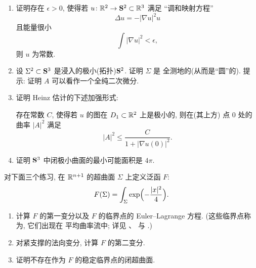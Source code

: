\begin{enumerate}[label=\textbf{Ex \arabic*.},leftmargin=3.7em,
  labelsep=0.5em,itemsep=0.85em,topsep=0.5em,parsep=0.35em]
\item 证明存在 $\epsilon>0$, 使得若 $u\colon\mathbb{R}^2\to\mathbf{S}^2\subset\mathbb{R}^3$ 满足
``调和映射方程''
\[
\Delta u=-|\nabla u|^2u
\]
且能量很小
\[
\int|\nabla u|^2<\epsilon,
\]
则 $u$ 为常数.

\item 设 $\Sigma^2\subset\mathbf{S}^3$ 是浸入的极小(拓扑)$\mathbf{S}^2$. 证明 $\Sigma$ 是
全测地的(从而是``圆''的). 提示: 证明 $A$ 可以看作一个全纯二次微分.

\item 证明 Heinz 估计的下述加强形式:

存在常数 $C$, 使得若 $u$ 的图在 $D_1\subset\mathbb{R}^2$ 上是极小的, 则在(其上方)
点 $0$ 处的曲率 $|A|^2$ 满足
\[
|A|^2\leq \frac{C}{1+|\nabla u(0)|^2}.
\]

\item 证明 $\mathbf{S}^3$ 中闭极小曲面的最小可能面积是 $4\pi$.

\end{enumerate}

{\setlength{\emergencystretch}{2em}%
对下面三个练习, 在 $\mathbb{R}^{n+1}$ 的超曲面 $\Sigma$ 上定义泛函 $F$:
\begin{equation}
F(\Sigma)=\int_\Sigma \exp\Bigl(-\frac{|x|^2}{4}\Bigr).
\label{eq:8.97}
\end{equation}
\par}

\begin{enumerate}[label=\textbf{Ex \arabic*.},leftmargin=3.7em,
  labelsep=0.5em,itemsep=0.85em,topsep=0.5em,parsep=0.35em,start=33]

\item 计算 $F$ 的第一变分以及 $F$ 的临界点的 Euler--Lagrange 方程.
(这些临界点称为, 它们出现在
平均曲率流中; 详见 \cite{Hu}、\cite{CM25} 与 \cite{CM6}.)

\item 对紧支撑的法向变分, 计算 $F$ 的第二变分.

\item 证明不存在作为 $F$ 的稳定临界点的闭超曲面.

\end{enumerate}

